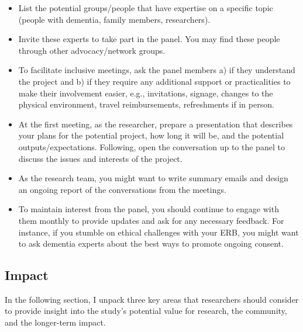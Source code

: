 \begin{itemize}
    \item List the potential groups/people that have expertise on a specific topic (people with dementia, family members, researchers).
    \item Invite these experts to take part in the panel. You may find these people through other advocacy/network groups.
    \item To facilitate inclusive meetings, ask the panel members a) if they understand the project and b) if they require any additional support or practicalities to make their involvement easier, e.g., invitations, signage, changes to the physical environment, travel reimbursements, refreshments if in person.
    \item At the first meeting, as the researcher, prepare a presentation that describes your plans for the potential project, how long it will be, and the potential outputs/expectations. Following, open the conversation up to the panel to discuss the issues and interests of the project.
    \item As the research team, you might want to write summary emails and design an ongoing report of the conversations from the meetings. 
    \item To maintain interest from the panel, you should continue to engage with them monthly to provide updates and ask for any necessary feedback. For instance, if you stumble on ethical challenges with your ERB, you might want to ask dementia experts about the best ways to promote ongoing consent. 

\end{itemize}

\subsection{Impact}
\label{Impact}
In the following section, I unpack three key areas that researchers should consider to provide insight into the study's potential value for research, the community, and the longer-term impact.

